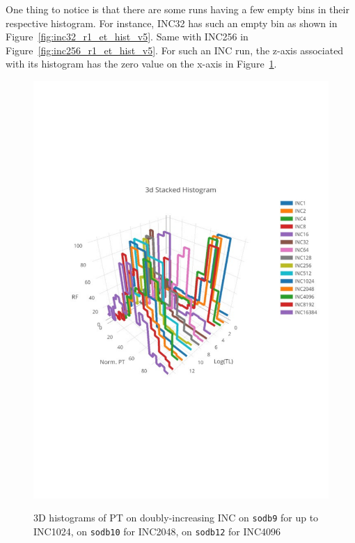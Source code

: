 One thing to notice is that there are some runs having a few empty bins 
in their respective histogram. For instance, INC32 has such an empty bin as shown in Figure~\ref{fig:inc32_r1_et_hist_v5}. 
Same with INC256 in Figure~\ref{fig:inc256_r1_et_hist_v5}. For such an INC run, the z-axis associated with its histogram has the zero value on the x-axis in Figure~\ref{fig:hist3d}. 

\begin{figure}[htp!]
	\centering
	\includegraphics[scale=1]{u_s_time/new_3d_plot}\label{fig:3d_plot}
	\caption{3D histograms of PT on doubly-increasing INC on {\tt sodb9} for up to INC1024, on {\tt sodb10} for INC2048, on {\tt sodb12} for INC4096~\label{fig:hist3d}}
\end{figure}

